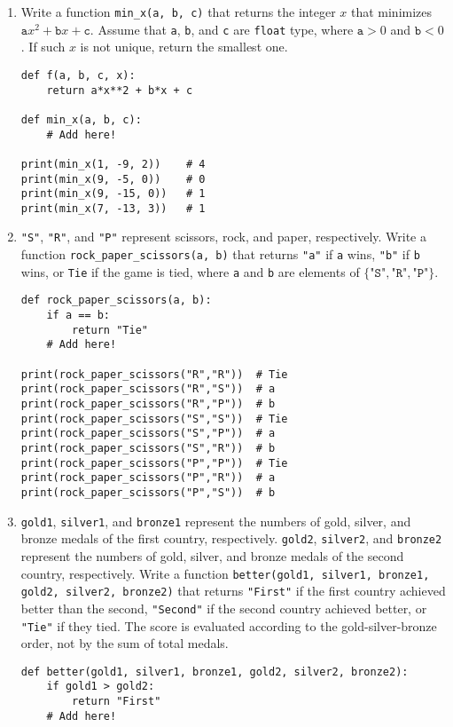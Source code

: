 \documentclass[../main.tex]{subfiles}
\begin{document}
\begin{enumerate}
\item Write a function \texttt{min\_x(a, b, c)} that returns the integer $x$ that minimizes $\texttt{a}x^2 + \texttt{b}x + \texttt{c}$.
Assume that \texttt{a}, \texttt{b}, and \texttt{c} are \texttt{float} type, where $\texttt{a} > 0$ and $\texttt{b} < 0$.
If such $x$ is not unique, return the smallest one.
\begin{verbatim}
def f(a, b, c, x):
    return a*x**2 + b*x + c

def min_x(a, b, c):
    # Add here!

print(min_x(1, -9, 2))    # 4
print(min_x(9, -5, 0))    # 0
print(min_x(9, -15, 0))   # 1
print(min_x(7, -13, 3))   # 1
\end{verbatim}

\item \texttt{"S"}, \texttt{"R"}, and \texttt{"P"} represent scissors, rock,
  and paper, respectively.  Write a function \texttt{rock\_paper\_scissors(a,
  b)} that returns \texttt{"a"} if \texttt{a} wins, \texttt{"b"} if \texttt{b}
  wins, or \texttt{Tie} if the game is tied, where \texttt{a} and \texttt{b}
  are elements of $\{\texttt{"S"}, \texttt{"R"}, \texttt{"P"}\}$.
\begin{verbatim}
def rock_paper_scissors(a, b):
    if a == b:
        return "Tie"
    # Add here!
    
print(rock_paper_scissors("R","R"))  # Tie
print(rock_paper_scissors("R","S"))  # a
print(rock_paper_scissors("R","P"))  # b
print(rock_paper_scissors("S","S"))  # Tie
print(rock_paper_scissors("S","P"))  # a
print(rock_paper_scissors("S","R"))  # b
print(rock_paper_scissors("P","P"))  # Tie
print(rock_paper_scissors("P","R"))  # a
print(rock_paper_scissors("P","S"))  # b
\end{verbatim}

\item \texttt{gold1}, \texttt{silver1}, and \texttt{bronze1} represent the
  numbers of gold, silver, and bronze medals of the first country,
  respectively.  \texttt{gold2}, \texttt{silver2}, and \texttt{bronze2}
  represent the numbers of gold, silver, and bronze medals of the second
  country, respectively.  Write a function \texttt{better(gold1, silver1,
  bronze1, gold2, silver2, bronze2)} that returns \texttt{"First"} if the first
  country achieved better than the second, \texttt{"Second"} if the second
  country achieved better, or \texttt{"Tie"} if they tied.  The score is
  evaluated according to the gold-silver-bronze order, not by the sum of total
  medals. 
\begin{verbatim}
def better(gold1, silver1, bronze1, gold2, silver2, bronze2):
    if gold1 > gold2:
        return "First"
    # Add here!


\end{verbatim}
\end{enumerate}
\end{document}

